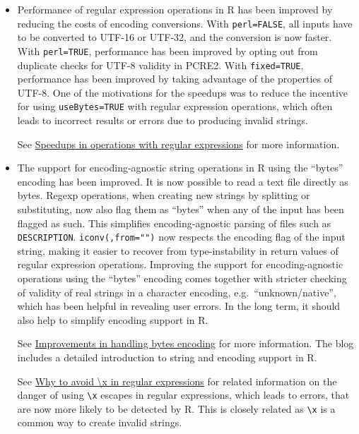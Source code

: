 \begin{itemize}
\item
  Performance of regular expression operations in R has been improved by
  reducing the costs of encoding conversions. With \texttt{perl=FALSE}, all
  inputs have to be converted to UTF-16 or UTF-32, and the conversion is
  now faster. With \texttt{perl=TRUE}, performance has been improved by opting
  out from duplicate checks for UTF-8 validity in PCRE2. With
  \texttt{fixed=TRUE}, performance has been improved by taking advantage of the
  properties of UTF-8. One of the motivations for the speedups was to
  reduce the incentive for using \texttt{useBytes=TRUE} with regular expression
  operations, which often leads to incorrect results or errors due to
  producing invalid strings.

  See \href{https://blog.r-project.org/2022/07/12/speedups-in-operations-with-regular-expressions}{Speedups in operations with regular expressions}
  for more information.
\item
  The support for encoding-agnostic string operations in R using the
  ``bytes'' encoding has been improved. It is now possible to read a text
  file directly as bytes. Regexp operations, when creating new strings by
  splitting or substituting, now also flag them as ``bytes'' when any of the
  input has been flagged as such. This simplifies encoding-agnostic parsing
  of files such as \texttt{DESCRIPTION}. \texttt{iconv(,from="")} now respects the
  encoding flag of the input string, making it easier to recover from
  type-instability in return values of regular expression operations.
  Improving the support for encoding-agnostic operations using the ``bytes''
  encoding comes together with stricter checking of validity of real
  strings in a character encoding, e.g.~``unknown/native'', which has been
  helpful in revealing user errors. In the long term, it should also help
  to simplify encoding support in R.

  See \href{https://blog.r-project.org/2022/10/10/improvements-in-handling-bytes-encoding}{Improvements in handling bytes encoding}
  for more information. The blog includes a detailed introduction to string and
  encoding support in R.

  See \href{https://blog.r-project.org/2022/06/27/why-to-avoid-\%5Cx-in-regular-expressions/}{Why to avoid \textbackslash x in regular expressions}
  for related information on the danger of using \texttt{\textbackslash{}x} escapes in regular
  expressions, which leads to errors, that are now more likely to be
  detected by R. This is closely related as \texttt{\textbackslash{}x} is a common way to
  create invalid strings.
\end{itemize}

